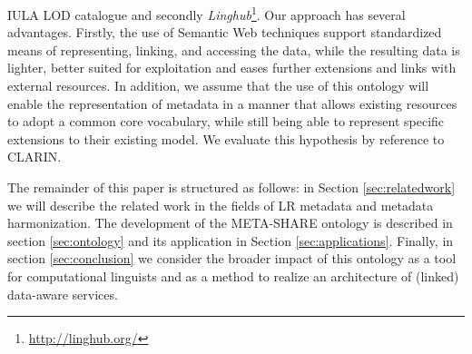 \documentclass{llncs}
\begin{document}
IULA LOD catalogue and secondly
\emph{Linghub}\footnote{\url{http://linghub.org/}}.
Our approach has several advantages. Firstly, the use of Semantic Web techniques support standardized means of representing, linking, and accessing the data, while 
the resulting data is lighter, better suited for exploitation and eases further
extensions and links with external resources.
In addition, we assume that the use of this ontology will enable the representation of metadata in a manner that allows existing resources to adopt a
common core vocabulary, while still being able to represent specific extensions
to their existing model. We evaluate this hypothesis by reference to 
CLARIN.

The remainder of this paper is structured as follows: in Section
\ref{sec:relatedwork} we will describe the related work in the fields of
LR metadata and metadata harmonization. The development of the
META-SHARE ontology is described in section \ref{sec:ontology}
and its application in Section \ref{sec:applications}.
Finally, in section \ref{sec:conclusion} we consider the broader
impact of this ontology as a tool for computational linguists and as a method to
realize an architecture of (linked) data-aware services.
\end{document}
